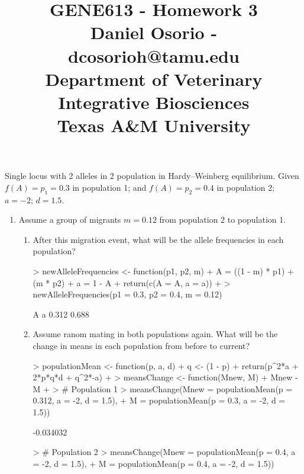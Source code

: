 \documentclass[12pt,a4paper]{paper}
\begin{document}
\title{GENE613 - Homework 3\\\small{Daniel Osorio - dcosorioh@tamu.edu\\Department of Veterinary Integrative Biosciences\\Texas A\&M University}}
\maketitle

Single locus with 2 alleles in 2 population in Hardy–Weinberg equilibrium. Given $f(A) = p_{1} = 0.3$ in population 1; and  $f(A) = p_{2} = 0.4$ in population 2; $a = -2$; $d = 1.5$.
\begin{enumerate}
\item Assume a group of migrants $m = 0.12$ from population 2 to population 1.
\begin{enumerate}
\item After this migration event, what will be the allele frequencies in each population?
\begin{Schunk}
\begin{Sinput}
> newAlleleFrequencies <- function(p1, p2, m) {
+   A = ((1 - m) * p1) + (m * p2)
+   a = 1 - A
+   return(c(A = A, a = a))
+ }
> newAlleleFrequencies(p1 = 0.3, p2 = 0.4, m = 0.12)
\end{Sinput}
\begin{Soutput}
    A     a 
0.312 0.688 
\end{Soutput}
\end{Schunk}
\item Assume ranom mating in both populations again. What will be the change in means in each population from before to current?
\begin{Schunk}
\begin{Sinput}
> populationMean <- function(p, a, d) {
+   q <- (1 - p)
+   return(p^2*a + 2*p*q*d + q^2*-a)
+ }
> meansChange <- function(Mnew, M){
+   Mnew - M
+ }
> # Population 1
> meansChange(Mnew = populationMean(p = 0.312, a = -2, d = 1.5), 
+             M = populationMean(p = 0.3, a = -2, d = 1.5))
\end{Sinput}
\begin{Soutput}
[1] -0.034032
\end{Soutput}
\begin{Sinput}
> # Population 2
> meansChange(Mnew = populationMean(p = 0.4, a = -2, d = 1.5), 
+             M = populationMean(p = 0.4, a = -2, d = 1.5))
\end{Sinput}
\begin{Soutput}

\end{Soutput}
\end{Schunk}
\end{enumerate}
\end{enumerate}
\end{document}
